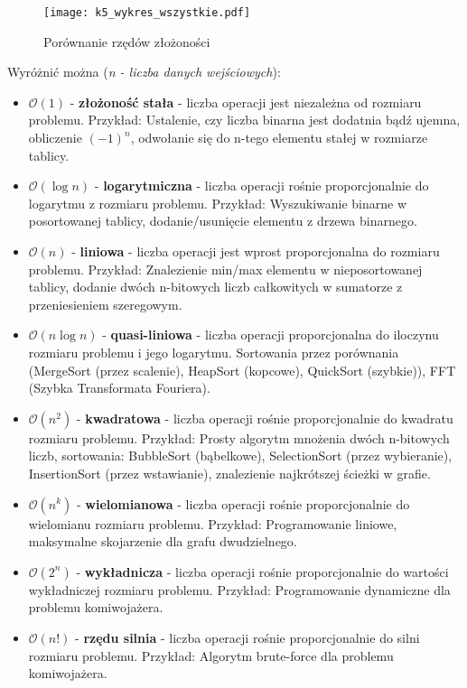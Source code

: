 \begin{figure}[!h]
\centering
\texttt{[image: k5\_wykres\_wszystkie.pdf]}
\caption{Porównanie rzędów złożoności}
\end{figure}

Wyróżnić można (\textit{n - liczba danych wejściowych}):
\begin{itemize}
	\item $\mathcal{O}(1)$ - \textbf{złożoność stała} -  liczba operacji jest niezależna od rozmiaru problemu. Przykład: Ustalenie, czy liczba binarna jest dodatnia bądź ujemna, obliczenie $(-1)^n$, odwołanie się do n-tego elementu stałej w rozmiarze tablicy.
	\item $\mathcal{O}(\log n)$ - \textbf{logarytmiczna} - liczba operacji rośnie proporcjonalnie do logarytmu z rozmiaru problemu. Przykład: Wyszukiwanie binarne w posortowanej tablicy, dodanie/usunięcie elementu z drzewa binarnego.
	\item $\mathcal{O}(n)$ - \textbf{liniowa} - liczba operacji jest wprost proporcjonalna do rozmiaru problemu. Przykład: Znalezienie min/max elementu w nieposortowanej tablicy, dodanie dwóch n-bitowych liczb całkowitych w sumatorze z przeniesieniem szeregowym.
	\item $\mathcal{O}(n\log n)$ - \textbf{quasi-liniowa} - liczba operacji proporcjonalna do iloczynu rozmiaru problemu i jego logarytmu. Sortowania przez porównania (MergeSort (przez scalenie), HeapSort (kopcowe), QuickSort (szybkie)), FFT (Szybka Transformata Fouriera).
	\item $\mathcal{O}(n^2)$ - \textbf{kwadratowa} - liczba operacji rośnie proporcjonalnie do kwadratu rozmiaru problemu. Przykład: Prosty algorytm mnożenia dwóch n-bitowych liczb, sortowania: BubbleSort (bąbelkowe), SelectionSort (przez wybieranie), InsertionSort (przez wstawianie), znalezienie najkrótszej ścieżki w grafie.
	\item $\mathcal{O}(n^k)$ - \textbf{wielomianowa} - liczba operacji rośnie proporcjonalnie do wielomianu rozmiaru problemu. Przykład: Programowanie liniowe, maksymalne skojarzenie dla grafu dwudzielnego.
	\item $\mathcal{O}(2^n)$ - \textbf{wykładnicza} - liczba operacji rośnie proporcjonalnie do wartości wykładniczej rozmiaru problemu. Przykład: Programowanie dynamiczne dla problemu komiwojażera.
	\item $\mathcal{O}(n!)$ - \textbf{rzędu silnia} - liczba operacji rośnie proporcjonalnie do silni rozmiaru problemu. Przykład: Algorytm brute-force dla problemu komiwojażera.
\end{itemize}
